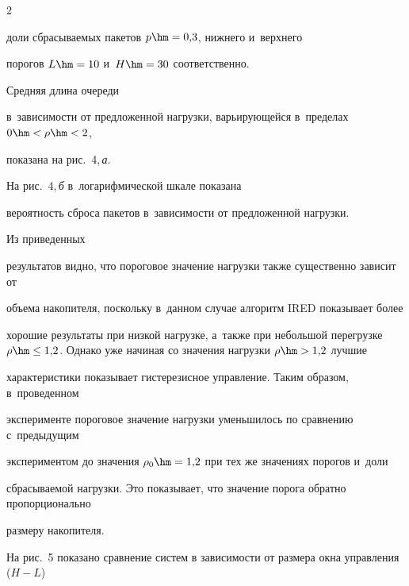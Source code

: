 \begin{multicols}{2}





\noindent


 доли сбрасываемых пакетов $p\hm= 0{,}3$, нижнего и~верхнего 


порогов $L\hm= 10$ и~$H\hm= 30$ со\-от\-вет\-ст\-венно. 





Средняя длина очереди 


в~за\-ви\-си\-мости от предложенной нагрузки, варьирующейся в~пределах  $0\hm<\rho \hm< 2$, 


показана на рис.~4,\,\textit{а}. 


%


На рис.~4,\,\textit{б} в~логарифмической шкале показана 


вероятность сброса пакетов в~за\-ви\-си\-мости от предложенной на\-грузки. 


{





}





Из приведенных 


результатов видно, что пороговое значение нагрузки также существенно зависит от 


объема накопителя, поскольку в~данном случае алгоритм IRED показывает более 


хорошие результаты при низкой нагрузке, а~также при небольшой перегрузке $\rho\hm\leq 


1{,}2$. Однако уже начиная со значения нагрузки $\rho \hm> 1{,}2$ лучшие 


характеристики показывает гистерезисное управ\-ле\-ние. Таким образом, в~проведенном 


эксперименте пороговое значение нагрузки уменьшилось по сравнению с~предыду\-щим 


экспериментом до значения $\rho_0\hm= 1{,}2$ при тех же значениях порогов и~доли 


сбрасываемой нагрузки. Это показывает, что значение порога обратно пропорционально 


размеру накопителя.


   





   На рис.~5 показано сравнение систем в зависимости от размера окна управления ($H-L$) 



\end{multicols}
